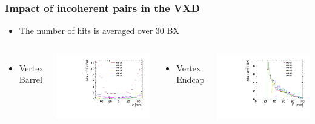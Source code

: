\documentclass[aspectratio=169, hyperref={colorlinks=true,pdfpagelabels=false,linkcolor=black}, xcolor=dvipsnames,10pt]{beamer}
\begin{document}
\begin{frame}
	\frametitle{Impact of incoherent pairs in the VXD}

	\begin{itemize}
	\item The number of hits is averaged over 30 BX
	\end{itemize}	
	
	
	\begin{columns}
		\begin{itemize}
		\item Vertex Barrel
		\end{itemize}
		\centering
		\includegraphics[width=\textwidth]{../figures/occupancy_VXD_barrel.pdf}
		
		\begin{itemize}
		\item Vertex Endcap
		\end{itemize}
		\centering
		\includegraphics[width=\textwidth]{../figures/occupancy_VXD_endcap.pdf}
	\end{columns}
	

\end{frame}
\end{document}
